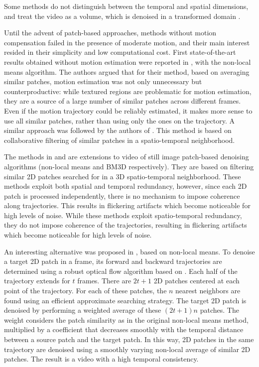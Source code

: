 \documentclass[10pt, a4paper]{article}
\newcommand{\pcomment}[1]{}
\begin{document}
Some methods do not distinguish between the temporal and spatial dimensions,
and treat the video as a volume, which is denoised in a transformed domain
\cite{Rajpoot2003,Wilson2004,Selesnick2003}. 
\pcomment{TODO: Read these references. Even if they consider a 3D transform, I think
they DO distinguish between space and time}

Until the advent of patch-based approaches, methods without motion compensation
failed in the presence of moderate motion, and their main interest resided
in their simplicity and low computational cost. First state-of-the-art results
obtained without motion estimation were reported in \cite{Buades2005v}, with the
non-local means algorithm. The authors argued that for their method, based on
averaging similar patches, motion estimation was not only unnecessary but
counterproductive: while textured regions are problematic for motion
estimation, they are a source of a large number of similar patches across
different frames. Even if the motion trajectory could be reliably estimated, it
makes more sense to use all similar patches, rather than using only the ones on the
trajectory.
%
A similar approach was followed by the authors of \cite{Dabov2007v}. This method is based
on collaborative filtering of similar patches in a
spatio-temporal neighborhood. 

The methods in \cite{Buades2005v} and \cite{Dabov2007v} are extensions to video
of still image patch-based denoising algorithms (non-local means \cite{Buades2006} and BM3D
\cite{Dabov2007tip} respectively). They are based on filtering similar 2D patches
searched for in a 3D spatio-temporal neighborhood. These methods exploit both
spatial and temporal redundancy, however, since each 2D patch is processed
independently, there is no mechanism to impose coherence along trajectories.
This results in flickering artifacts which become noticeable for high levels of
noise. 
%
While these methods exploit spatio-temporal redundancy, they do not impose
coherence of the trajectories, resulting in flickering
artifacts which become noticeable for high levels of noise. 

An interesting alternative was proposed in \cite{Liu2010},
based on non-local means.
To denoise a target 2D patch in a frame, its forward and backward trajectories are
determined using a robust optical flow algorithm based on \cite{Bruhn2005}. 
Each half of the trajectory extends for $t$ frames. There are $2t + 1$ 2D patches
centered at each point of the trajectory.
For each of these patches, the $n$ nearest neighbors are found
using an efficient approximate searching strategy. The target 2D patch is denoised
by performing a weighted average of these $(2t + 1)n$ patches. The weight considers
the patch similarity as in the original non-local means method, multiplied by a coefficient
that decreases smoothly with the temporal distance between a source patch and the target patch.
%
In this way, 2D patches in the same trajectory are denoised using a smoothly
varying non-local average of similar 2D patches. The result is a video with
a high temporal consistency.
\end{document}
